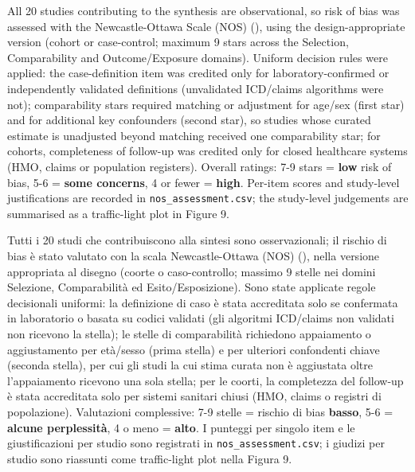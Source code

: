 \documentclass[
  letterpaper,
  DIV=11,
  numbers=noendperiod]{scrartcl}
\begin{document}
All 20 studies contributing to the synthesis are observational, so risk
of bias was assessed with the Newcastle-Ottawa Scale (NOS)
(), using the
design-appropriate version (cohort or case-control; maximum 9 stars
across the Selection, Comparability and Outcome/Exposure domains).
Uniform decision rules were applied: the case-definition item was
credited only for laboratory-confirmed or independently validated
definitions (unvalidated ICD/claims algorithms were not); comparability
stars required matching or adjustment for age/sex (first star) and for
additional key confounders (second star), so studies whose curated
estimate is unadjusted beyond matching received one comparability star;
for cohorts, completeness of follow-up was credited only for closed
healthcare systems (HMO, claims or population registers). Overall
ratings: 7-9 stars = \textbf{low} risk of bias, 5-6 = \textbf{some
concerns}, 4 or fewer = \textbf{high}. Per-item scores and study-level
justifications are recorded in \texttt{nos\_assessment.csv}; the
study-level judgements are summarised as a traffic-light plot in Figure
9.

Tutti i 20 studi che contribuiscono alla sintesi sono osservazionali; il
rischio di bias è stato valutato con la scala Newcastle-Ottawa (NOS)
(), nella versione appropriata
al disegno (coorte o caso-controllo; massimo 9 stelle nei domini
Selezione, Comparabilità ed Esito/Esposizione). Sono state applicate
regole decisionali uniformi: la definizione di caso è stata accreditata
solo se confermata in laboratorio o basata su codici validati (gli
algoritmi ICD/claims non validati non ricevono la stella); le stelle di
comparabilità richiedono appaiamento o aggiustamento per età/sesso
(prima stella) e per ulteriori confondenti chiave (seconda stella), per
cui gli studi la cui stima curata non è aggiustata oltre l'appaiamento
ricevono una sola stella; per le coorti, la completezza del follow-up è
stata accreditata solo per sistemi sanitari chiusi (HMO, claims o
registri di popolazione). Valutazioni complessive: 7-9 stelle = rischio
di bias \textbf{basso}, 5-6 = \textbf{alcune perplessità}, 4 o meno =
\textbf{alto}. I punteggi per singolo item e le giustificazioni per
studio sono registrati in \texttt{nos\_assessment.csv}; i giudizi per
studio sono riassunti come traffic-light plot nella Figura 9.
\end{document}
